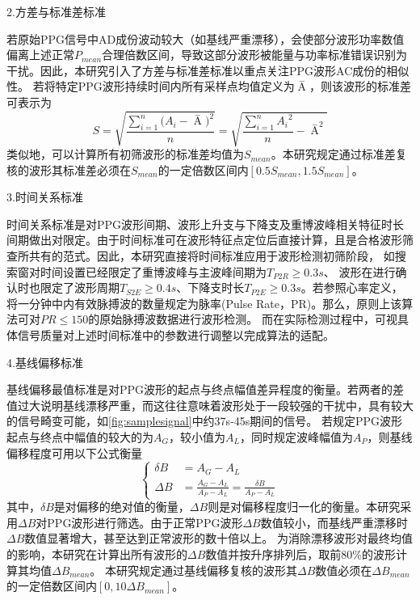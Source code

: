 2.方差与标准差标准

若原始PPG信号中AD成份波动较大（如基线严重漂移），会使部分波形功率数值偏离上述正常$P_{mean}$合理倍数区间，导致这部分波形被能量与功率标准错误识别为干扰。因此，本研究引入了方差与标准差标准以重点关注PPG波形AC成份的相似性。
若将特定PPG波形持续时间内所有采样点均值定义为$\mathop{A} \limits^-$，则该波形的标准差可表示为
\begin{equation}
    \label{equ:ppgstd}
    S=\sqrt{\frac{\sum_{i=1}^{n}{(A_i-\mathop{A} \limits^-})^2}{n}}=\sqrt{\frac{\sum_{i=1}^n{A_i}^2}{n}-{\mathop{A} \limits^-}^2}
\end{equation}
类似地，可以计算所有初筛波形的标准差均值为$S_{mean}$。本研究规定通过标准差复核的波形其标准差必须在$S_{mean}$的一定倍数区间内$[0.5S_{mean},1.5S_{mean}]$。

3.时间关系标准

时间关系标准是对PPG波形间期、波形上升支与下降支及重博波峰相关特征时长间期做出对限定。由于时间标准可在波形特征点定位后直接计算，且是合格波形筛查所共有的范式。因此，本研究直接将时间标准应用于波形检测初筛阶段，
如搜索窗对时间设置已经限定了重博波峰与主波峰间期为$T_{P2R}\ge0.3s$、
波形在进行确认时也限定了波形周期$T_{S2E}\ge 0.4s$、下降支时长$T_{P2E}\ge 0.3s$。若参照心率定义，将一分钟中内有效脉搏波的数量规定为脉率(Pulse Rate，PR)。那么，原则上该算法可对$PR \le 150$的原始脉搏波数据进行波形检测。
而在实际检测过程中，可视具体信号质量对上述时间标准中的参数进行调整以完成算法的适配。

4.基线偏移标准

基线偏移最值标准是对PPG波形的起点与终点幅值差异程度的衡量。若两者的差值过大说明基线漂移严重，而这往往意味着波形处于一段较强的干扰中，具有较大的信号畸变可能，如\autoref{fig:samplesignal}中约37s-45s期间的信号。
若规定PPG波形起点与终点中幅值的较大的为$A_G$，较小值为$A_L$，同时规定波峰幅值为$A_P$，则基线偏移程度可用以下公式衡量
\begin{equation}
    \label{equ:baselinestd}
    \left \{
    \begin{aligned}
        \delta B &=A_G-A_L \\
        \Delta B &=\frac{A_G-A_L}{A_P-A_L}=\frac{\delta B}{A_P-A_L}
    \end{aligned}
    \right.
\end{equation}
其中，$\delta B$是对偏移的绝对值的衡量，$\Delta B$则是对偏移程度归一化的衡量。本研究采用$\Delta B$对PPG波形进行筛选。由于正常PPG波形$\Delta B$数值较小，而基线严重漂移时$\Delta B$数值显著增大，甚至达到正常波形的数十倍以上。
为消除漂移波形对最终均值的影响，本研究在计算出所有波形的$\Delta B$数值并按升序排列后，取前$80\%$的波形计算其均值${\Delta B}_{mean}$。
本研究规定通过基线偏移复核的波形其$\Delta B$数值必须在${\Delta B}_{mean}$的一定倍数区间内$[0,10{\Delta B}_{mean}]$。

